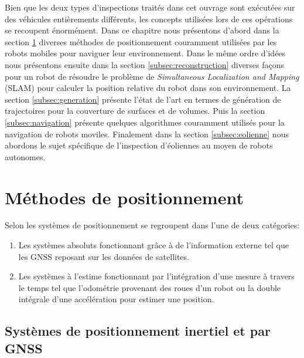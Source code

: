 \label{sec:RevLitt}

Bien que les deux types d'inspections traités dans cet ouvrage sont exécutées sur des véhicules entièrements différents, les concepts utilisées lors de ces opérations se recoupent énormément. Dans ce chapitre nous présentons d'abord dans la section \ref{subsec:positionnement} diverses méthodes de positionnement couramment utilisées par les robots mobiles pour naviguer leur environnement. Dans le même ordre d'idées nous présentons ensuite dans la section \ref{subsec:reconstruction} diverses façons pour un robot de résoudre le problème de \textit{Simultaneous Localization and Mapping} (SLAM) pour calculer la position relative du robot dans son environnement. La section \ref{subsec:generation} présente l'état de l'art en termes de génération de trajectoires pour la couverture de surfaces et de volumes. Puis la section \ref{subsec:navigation} présente quelques algorithmes couramment utilisés pour la navigation de robots moviles. Finalement dans la section \ref{subsec:eolienne} nous abordons le sujet spécifique de l'inspection d'éoliennes au moyen de robots autonomes.

\section{Méthodes de positionnement}\label{subsec:positionnement}

Selon \citep{Borenstein1997} les systèmes de positionnement se regroupent dans l'une de deux catégories:

\begin{enumerate}
  \item Les systèmes absoluts fonctionnant grâce à de l'information externe tel que les GNSS reposant sur les données de satellites.
  \item Les systèmes à l'estime fonctionnant par l'intégration d'une mesure à travers le temps tel que l'odométrie provenant des roues d'un robot ou la double intégrale d'une accélération pour estimer une position.
\end{enumerate}

\subsection{Systèmes de positionnement inertiel et par GNSS}

